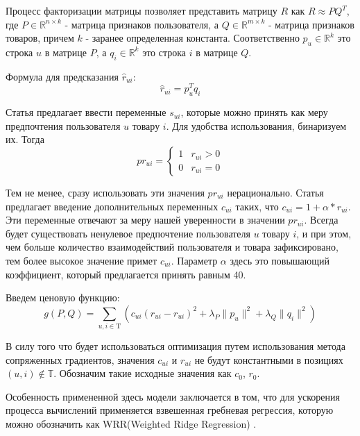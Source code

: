 \documentclass[14pt]{mmcs_article}
\begin{document}
Процесс факторизации матрицы позволяет представить матрицу $R$ как $R \approx P Q^T$, где $P \in  \mathbb {R}^{n\times k}$ - матрица признаков пользователя, а  $Q \in  \mathbb {R}^{m\times k}$ - матрица признаков товаров, причем $k$ - заранее определенная константа. 
Соответственно $p_u \in \mathbb {R}^{k}$ это строка $u$ в матрице $P$, а $q_i \in \mathbb {R}^{k}$ это строка $i$ в матрице $Q$. 

Формула для предсказания  $\hat{r}_{ui}$:
\begin{equation}
	 \hat{r}_{ui} = p_u^T q_i
\end{equation}

Статья \cite{ALS:CFIFD} предлагает ввести переменные $s_{ui}$, которые можно принять как меру предпочтения пользователя $u$ товару $i$. Для удобства использования, бинаризуем их. Тогда
\begin{equation}
	pr_{ui} = \begin{cases}
		1 & r_{ui} > 0 \\
		0 & r_{ui} = 0
	\end{cases}
\end{equation}

Тем не менее, сразу использовать эти значения $pr_{ui}$ нерационально. Статья \cite{ALS:CFIFD} предлагает введение дополнительных переменных $c_{ui}$ таких, что $c_{ui} = 1 + \alpha * r_{ui}$. Эти переменные отвечают за меру нашей уверенности в значении $pr_{ui}$.  Всегда будет существовать ненулевое предпочтение пользователя $u$ товару $i$, и при этом, чем больше количество взаимодействий пользователя и товара зафиксировано, тем более высокое значение примет $c_{ui}$. Параметр $\alpha$ здесь это повышающий коэффициент, который предлагается принять равным 40. 


Введем ценовую функцию:
\begin{equation}
	g(P, Q) = \sum_{u, i \in \mathrm{T}} (c_{ui}(\hat{r}_{ui} - r_{ui})^2 + \lambda_P\parallel p_u \parallel^2 + \lambda_Q\parallel q_i \parallel^2) 
\end{equation}

В силу того что будет использоваться оптимизация путем использования метода сопряженных градиентов, значения $c_{ui}$ и $r_{ui}$ не будут константными в позициях $(u,i) \not\in \mathbb{T}$. Обозначим такие исходные значения как $c_0$, $r_0$.

Особенность примененной здесь модели заключается в том, что для ускорения процесса вычислений применяется взвешенная гребневая регрессия, которую можно обозначить как WRR(Weighted Ridge Regression) \cite{implicit:all}.
\end{document}
